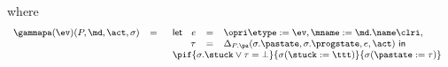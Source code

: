 \noindent where
\[
{\small
\begin{array}[t]{rcl}
\gammapa(\ev)(P, \md, \act, \sigma) & = &
\begin{array}[t]{l}
\mathsf{let\ }
\begin{array}[t]{rcl}
  e & = & \opri \etype := \ev, \mname := \md.\name \clri,\\
 \tau & = & \Delta_{P.\pa}(\sigma.\pastate, \sigma.\progstate, e, \act)
\mathsf{\ in\ }\end{array}
\\
\pif{\sigma.\stuck \vee \tau = \bot}
    {\sigma (\stuck := \ttt)}
    {\sigma (\pastate := \tau)}
\end{array}
\end{array}}
\]
